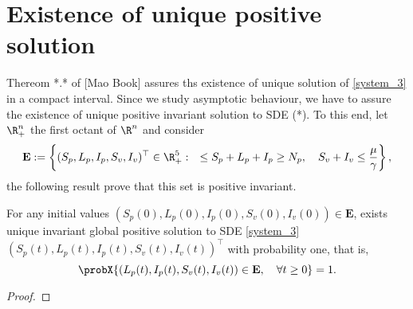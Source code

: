 \section{Existence of unique positive solution}
Thereom *.* of [Mao Book] assures ths existence of unique solution of \eqref{system_3} 
in a compact interval. Since we study asymptotic behaviour, we have to assure the existence of 
unique positive invariant solution to SDE (*). To this end, let $\R^n_+$ the first octant of $\R ^ n$ and consider  
$$	{
	\mathbf{E}:= 
		\left \{ 
			(S_p, L_p, I_p, S_v, I_v)^{\top} \in \R^5_+: \quad
			\leq S_p + L_p + I_p \geq N_p, \quad
			S_v + I_v \leq \frac{\mu}{\gamma}
		\right \},
	}
$$
the following result prove that this set is positive invariant.

\begin{theorem}\label{existence-unique}
	For any initial values 
	$
		(S_p(0), L_p(0), I_p(0), S_v(0), I_v(0)) 
		\in \mathbf{E}
	$, 
	 exists unique invariant global positive solution to SDE \eqref{system_3}
	$
	 	(S_p(t), L_p(t), I_p(t) ,S_v(t), I_v(t)) ^{\top}
	$ with probability one, that is,
	\begin{equation*}
		\probX{
			(L_p(t), I_p(t), S_v(t), I_v(t)) 
			\in 
			\mathbf{E}, \quad
			\forall t \geq 0
		} = 1.
	\end{equation*}
\end{theorem}
\begin{proof}
%	
\end{proof}